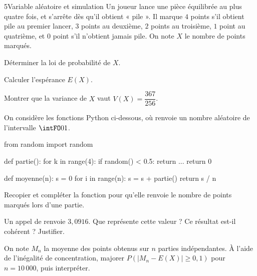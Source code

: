 

\begin{exoBac}{5}{Variable aléatoire et simulation}
Un joueur lance une pièce équilibrée au plus quatre fois, et s'arrête dès qu'il obtient « pile ». Il marque $4$ points s'il obtient
pile au premier lancer, $3$ points au deuxième, $2$ points au troisième, $1$ point au quatrième, et $0$ point s'il n'obtient jamais
pile. On note $X$ le nombre de points marqués.
\begin{questions}
  \item Déterminer la loi de probabilité de $X$.
  \item Calculer l'espérance $E(X)$.
  \item Montrer que la variance de $X$ vaut $V(X)=\dfrac{367}{256}$.
\end{questions}
On considère les fonctions Python ci-dessous, où  renvoie un nombre aléatoire de l'intervalle $\intFO01$.
\begin{codecote}[0.5]
\begin{pythoncol}
from random import random

def partie():
    for k in range(4):
        if random() < 0.5:
            return ...
    return 0
\end{pythoncol}
\cote
\begin{pythoncol}
def moyenne(n):
    s = 0
    for i in range(n):
        s = s + partie()
    return s / n
\end{pythoncol}
\end{codecote}
\begin{questions}[resume]
  \item Recopier et compléter la fonction  pour qu'elle renvoie le nombre de points marqués lors d'une partie.
  \item Un appel de  renvoie $3{,}0916$. Que représente cette valeur ? Ce résultat est-il cohérent ? Justifier.
  \item On note $M_n$ la moyenne des points obtenus sur $n$ parties indépendantes. À l'aide de l'inégalité de concentration, majorer
    $P\left(\left|M_n-E(X)\right|\geq0{,}1\right)$ pour $n=10\,000$, puis interpréter.
\end{questions}
\end{exoBac}

